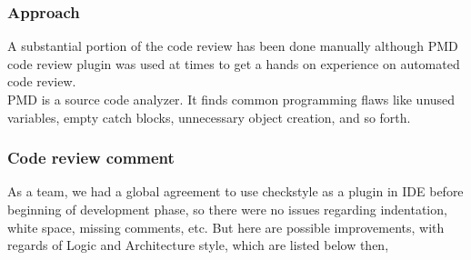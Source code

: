 \documentclass[a4paper,11pt]{report}
\begin{document}
\subsubsection{Approach}
A substantial portion of the code review has been done manually although PMD code review plugin was used at times to get a hands on experience on automated code review.\\
PMD is a source code analyzer. It finds common programming flaws like unused variables, empty catch blocks, unnecessary object creation, and so forth.\cite{pmd}
\subsubsection{Code review comment}
As a team, we had a global agreement to use checkstyle as a plugin in IDE before beginning of development phase, so there were no issues regarding indentation, white space, missing comments, etc.
\newline
But here are possible improvements, with regards of Logic and Architecture style, which are listed below
\newline
then,
\end{document}
